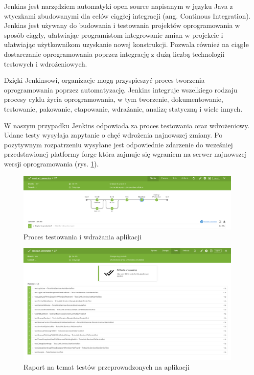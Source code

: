 Jenkins jest narzędziem automatyki open source napisanym w języku Java z wtyczkami zbudowanymi dla celów ciągłej integracji (ang. Continous Integration). Jenkins jest używany do budowania i testowania projektów oprogramowania w sposób ciągły, ułatwiając programistom integrowanie zmian w projekcie i ułatwiając użytkownikom uzyskanie nowej konstrukcji. Pozwala również na ciągłe dostarczanie oprogramowania poprzez integrację z dużą liczbą technologii testowych i wdrożeniowych.

Dzięki Jenkinsowi, organizacje mogą przyspieszyć proces tworzenia oprogramowania poprzez automatyzację. Jenkins integruje wszelkiego rodzaju procesy cyklu życia oprogramowania, w tym tworzenie, dokumentowanie, testowanie, pakowanie, etapowanie, wdrażanie, analizę statyczną i wiele innych.

W naszym przypadku Jenkins odpowiada za proces testowania oraz wdrożeniowy. Udane testy wysyłaja zapytanie o chęć wdrożenia najnowszej zmiany. Po pozytywnym rozpatrzeniu wysyłane jest odpowiednie zdarzenie do wcześniej przedstawionej platformy forge która zajmuje się wgraniem na serwer najnowszej wersji oprogramowania (rys. \ref{fig:jenkins}).

\begin{figure}[!ht]
    \centering
    \includegraphics[width=6in]{images/jenkins.png}
    \caption{Proces testowania i wdrażania aplikacji \label{fig:jenkins}}
\end{figure}

\begin{figure}[!ht]
    \centering
    \includegraphics[width=6in]{images/jenkins-test.png}
    \caption{Raport na temat testów przeprowadzonych na aplikacji \label{fig:jenkins-test}}
\end{figure}

